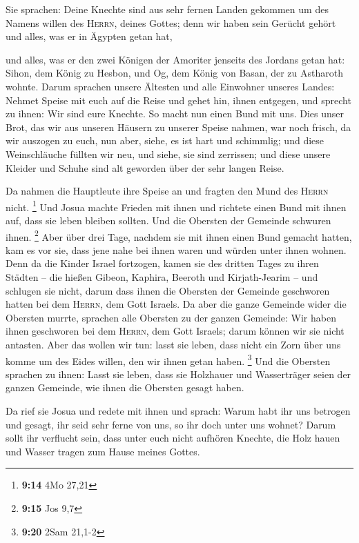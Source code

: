  Sie sprachen: Deine Knechte sind aus sehr fernen Landen
gekommen um des Namens willen des \textsc{Herrn}, deines Gottes; denn
wir haben sein Gerücht gehört und alles, was er in Ägypten getan hat,

 und alles, was er den zwei Königen der Amoriter jenseits
des Jordans getan hat: Sihon, dem König zu Hesbon, und Og, dem König von
Basan, der zu Astharoth wohnte.  Darum sprachen unsere
Ältesten und alle Einwohner unseres Landes: Nehmet Speise mit euch auf
die Reise und gehet hin, ihnen entgegen, und sprecht zu ihnen: Wir sind
eure Knechte. So macht nun einen Bund mit uns.  Dies
unser Brot, das wir aus unseren Häusern zu unserer Speise nahmen, war
noch frisch, da wir auszogen zu euch, nun aber, siehe, es ist hart und
schimmlig;  und diese Weinschläuche füllten wir neu, und
siehe, sie sind zerrissen; und diese unsere Kleider und Schuhe sind alt
geworden über der sehr langen Reise.

 Da nahmen die Hauptleute ihre Speise an und fragten den
Mund des \textsc{Herrn} nicht. \footnote{\textbf{9:14} 4Mo 27,21}
 Und Josua machte Frieden mit ihnen und richtete einen
Bund mit ihnen auf, dass sie leben bleiben sollten. Und die Obersten der
Gemeinde schwuren ihnen. \footnote{\textbf{9:15} Jos 9,7}
 Aber über drei Tage, nachdem sie mit ihnen einen Bund
gemacht hatten, kam es vor sie, dass jene nahe bei ihnen waren und
würden unter ihnen wohnen.  Denn da die Kinder Israel
fortzogen, kamen sie des dritten Tages zu ihren Städten -- die hießen
Gibeon, Kaphira, Beeroth und Kirjath-Jearim --  und
schlugen sie nicht, darum dass ihnen die Obersten der Gemeinde
geschworen hatten bei dem \textsc{Herrn}, dem Gott Israels. Da aber die
ganze Gemeinde wider die Obersten murrte,  sprachen alle
Obersten zu der ganzen Gemeinde: Wir haben ihnen geschworen bei dem
\textsc{Herrn}, dem Gott Israels; darum können wir sie nicht antasten.
 Aber das wollen wir tun: lasst sie leben, dass nicht ein
Zorn über uns komme um des Eides willen, den wir ihnen getan haben.
\footnote{\textbf{9:20} 2Sam 21,1-2}  Und die Obersten
sprachen zu ihnen: Lasst sie leben, dass sie Holzhauer und Wasserträger
seien der ganzen Gemeinde, wie ihnen die Obersten gesagt haben.

 Da rief sie Josua und redete mit ihnen und sprach: Warum
habt ihr uns betrogen und gesagt, ihr seid sehr ferne von uns, so ihr
doch unter uns wohnet?  Darum sollt ihr verflucht sein,
dass unter euch nicht aufhören Knechte, die Holz hauen und Wasser tragen
zum Hause meines Gottes.

